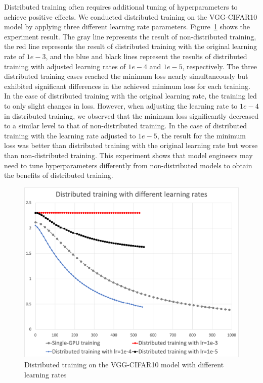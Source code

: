 Distributed training often requires additional tuning of hyperparameters to
achieve positive effects.
We conducted distributed training on the VGG-CIFAR10 model by applying three
different learning rate parameters.
Figure~\ref{fig:eval:cifar10} shows the experiment result.
The gray line represents the result of non-distributed training, the red line
represents the result of distributed training with the original learning rate
of $1e-3$, and the blue and black lines represent the results of distributed
training with adjusted learning rates of $1e-4$ and $1e-5$, respectively.
The three distributed training cases reached the minimum loss nearly
simultaneously but exhibited significant differences in the
achieved minimum loss for each training.
In the case of distributed training with the original learning rate, the
training led to only slight changes in loss.
However, when adjusting the learning rate to $1e-4$ in distributed training, 
we observed that the minimum loss significantly decreased to a similar level
to that of non-distributed training.
In the case of distributed training with the learning rate adjusted to $1e-5$,
the result for the minimum loss was better than distributed training with the
original learning rate but worse than non-distributed training.
This experiment shows that model engineers may need to tune hyperparameters
differently from non-distributed models to obtain the benefits of distributed
training.

\begin{figure}%
  \centering
  \includegraphics[width=.5\textwidth]{lr-exp-graph}
  \caption{Distributed training on the VGG-CIFAR10 model with different learning rates}
  \label{fig:eval:cifar10}
\end{figure}


